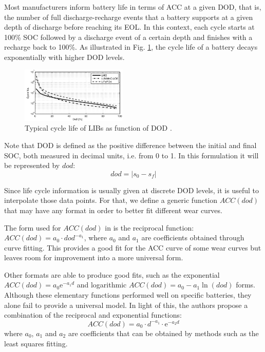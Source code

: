\documentclass{ieeeaccess}
\begin{document}
    Most manufacturers inform battery life in terms of \ac{ACC} at a given \ac{DOD}, that is, the number of full discharge-recharge events that a battery supports at a given depth of discharge before reaching its \ac{EOL}. In this context, each cycle starts at 100\% \ac{SOC} followed by a discharge event of a certain depth and finishes with a recharge back to 100\%. As illustrated in Fig. \ref{fig:acc_curves1}, the cycle life of a battery decays exponentially with higher \ac{DOD} levels.
    \begin{figure}[htbp]
        \centering
        \includegraphics[width=0.45\textwidth]{figures/acc_curves1.png}
        \caption{Typical cycle life of \acp{LIB} as function of \ac{DOD} \cite{XU2016}.}
        \label{fig:acc_curves1}
    \end{figure}

    Note that \ac{DOD} is defined as the positive difference between the initial and final \ac{SOC}, both measured in decimal units, i.e. from 0 to 1. In this formulation it will be represented by $dod$:
        $$ dod = |s_{0}-s_{f}|$$

    Since life cycle information is usually given at discrete \ac{DOD} levels, it is useful to interpolate those data points. For that, we define a generic function $ACC(dod)$ that may have any format in order to better fit different wear curves.

    The form used for $ACC(dod)$ in \cite{HAN2014} is the reciprocal function: $ACC(dod) = a_{0} \cdot dod^{-a_{1}}$, where $a_{0}$ and $a_{1}$ are coefficients obtained through curve fitting. This provides a good fit for the \ac{ACC} curve of some wear curves but leaves room for improvement into a more universal form.

    Other formats are able to produce good fits, such as the exponential $ACC(dod) = a_0 \mathrm{e}^{-a_1 d}$ and logarithmic $ACC(dod) = a_0 - a_1 \ln(dod)$ forms. Although these elementary functions performed well on specific batteries, they alone fail to provide a universal model. In light of this, the authors propose a combination of the reciprocal and exponential functions:
    \begin{equation}
    	ACC(dod) = a_0 \cdot d^{-a_1} \cdot \mathrm{e}^{-a_2 d}
    	\label{eq:ACC(dod)}
    \end{equation}
    where $a_0$, $a_1$ and $a_2$ are coefficients that can be obtained by methods such as the least squares fitting.
\end{document}
